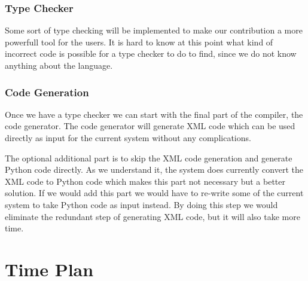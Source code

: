\documentclass[a4paper]{article}
\begin{document}
\subsubsection{Type Checker}
Some sort of type checking will be implemented to make our
contribution a more powerfull tool for the users. It is hard to know
at this point what kind of incorrect code is possible for a type
checker to do to find, since we do not know anything about the
language.

\subsubsection{Code Generation}
Once we have a type checker we can start with the final part of the
compiler, the code generator. The code generator will generate XML
code which can be used directly as input for the current system
without any complications.

The optional additional part is to skip the XML code generation and
generate Python code directly. As we understand it, the system does
currently convert the XML code to Python code which makes this part
not necessary but a better solution. If we would add this part we
would have to re-write some of the current system to take Python code
as input instead. By doing this step we would eliminate the redundant
step of generating XML code, but it will also take more time.


\section{Time Plan}
\end{document}
